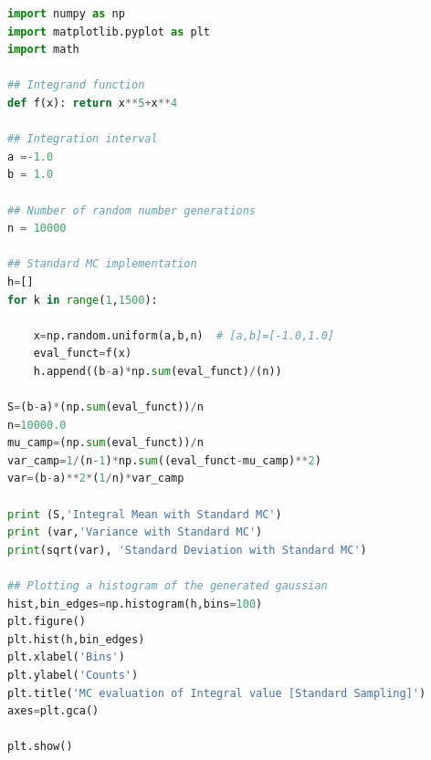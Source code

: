 \begin{lstlisting}[language=python, style=Pystyle, caption=\texttt{Python} code for Standard Montecarlo Calculation, label=list:MC, 	captionpos=t]
import numpy as np
import matplotlib.pyplot as plt
import math

## Integrand function
def f(x): return x**5+x**4

## Integration interval
a =-1.0
b = 1.0

## Number of random number generations
n = 10000

## Standard MC implementation
h=[]
for k in range(1,1500):  

	x=np.random.uniform(a,b,n)  # [a,b]=[-1.0,1.0]
	eval_funct=f(x) 
	h.append((b-a)*np.sum(eval_funct)/(n))

S=(b-a)*(np.sum(eval_funct))/n
n=10000.0
mu_camp=(np.sum(eval_funct))/n
var_camp=1/(n-1)*np.sum((eval_funct-mu_camp)**2)
var=(b-a)**2*(1/n)*var_camp

print (S,'Integral Mean with Standard MC')
print (var,'Variance with Standard MC')
print(sqrt(var), 'Standard Deviation with Standard MC')

## Plotting a histogram of the generated gaussian
hist,bin_edges=np.histogram(h,bins=100)
plt.figure()
plt.hist(h,bin_edges)
plt.xlabel('Bins')
plt.ylabel('Counts')
plt.title('MC evaluation of Integral value [Standard Sampling]')
axes=plt.gca()

plt.show()
\end{lstlisting}

